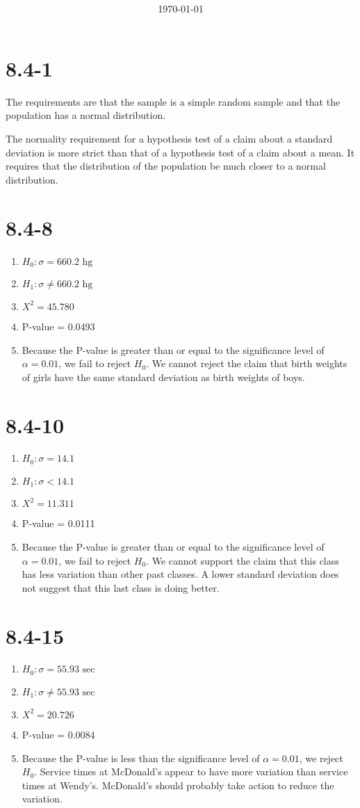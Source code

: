 \documentclass[12pt,fleqn]{article}
\title{\classdescription\ \\ \classname\ \\ $\ $ \\ \assignment}
\author{\authorname}
\date{\today}
\newcommand{\chapter}{8.4}
\newcommand{\problem}[1]{\vspace{5ex}\section*{\chapter-#1}}
\begin{document}
\maketitle


\problem{1}
The requirements are that the sample is a simple random sample and that the population has a normal distribution.

The normality requirement for a hypothesis test of a claim about a standard deviation is more strict than that of a hypothesis test of a claim about a mean. It requires that the distribution of the population be much closer to a normal distribution.


\problem{8}
\begin{enumerate}[label=\alph*.]
  \item $H_0: \sigma = 660.2 \text{~hg}$
  \item $H_1: \sigma \ne 660.2 \text{~hg}$
  \item $X^2 = 45.780$
  \item P-value = 0.0493
  \item Because the P-value is greater than or equal to the significance level of $\alpha = 0.01$, we fail to reject $H_0$. We cannot reject the claim that birth weights of girls have the same standard deviation as birth weights of boys.
\end{enumerate}


\problem{10}
\begin{enumerate}[label=\alph*.]
  \item $H_0: \sigma = 14.1$
  \item $H_1: \sigma < 14.1$
  \item $X^2 = 11.311$
  \item P-value = 0.0111
  \item Because the P-value is greater than or equal to the significance level of $\alpha = 0.01$, we fail to reject $H_0$. We cannot support the claim that this class has less variation than other past classes. A lower standard deviation does not suggest that this last class is doing better.
\end{enumerate}


\problem{15}
\begin{enumerate}[label=\alph*.]
  \item $H_0: \sigma = 55.93 \text{~sec}$
  \item $H_1: \sigma \ne 55.93 \text{~sec}$
  \item $X^2 = 20.726$
  \item P-value = 0.0084
  \item Because the P-value is less than the significance level of $\alpha = 0.01$, we reject $H_0$. Service times at McDonald's appear to have more variation than service times at Wendy's. McDonald's should probably take action to reduce the variation.
\end{enumerate}
\end{document}
